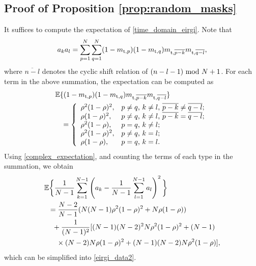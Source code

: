 \documentclass[journal,a4paper,10pt, romanappendices]{IEEEtran}
\begin{document}
\subsection{Proof of Proposition \ref{prop:random_masks}}\label{sec:proof_random_masks}
\begin{IEEEproof}
It suffices to compute the expectation of \eqref{time_domain_eirgi}. Note that
$$
a_k a_l = \sum_{p=1}^N \sum_{q=1}^N (1-m_{{\rm t},p})(1-m_{{\rm t},q})m_{{\rm t},\overline{p-k}}m_{{\rm t},\overline{q-l}},
$$
where $\overline{n-l}$ denotes the cyclic shift relation of $(n-l-1)~{\rm mod}~N+1$. For each term in the above summation, the expectation can be computed as
\begin{equation}\label{complex_expectation}
\begin{aligned}
&\mathbb{E}\{(1-m_{{\rm t},p})(1-m_{{\rm t},q})m_{{\rm t},\overline{p-k}}m_{{\rm t},\overline{q-l}}\}\\
&\hspace{3mm}=\left\{
  \begin{array}{ll}
    \rho^2(1-\rho)^2, & \hbox{$p\neq q$, $k\neq l$, $\overline{p-k}\neq \overline{q-l}$;} \\
    \rho(1-\rho)^2, & \hbox{$p\neq q$, $k\neq l$, $\overline{p-k}= \overline{q-l}$;} \\
    \rho^2(1-\rho), & \hbox{$p=q$, $k\neq l$;} \\
    \rho^2(1-\rho)^2, & \hbox{$p\neq q$, $k=l$;} \\
    \rho(1-\rho), & \hbox{$p=q$, $k=l$.} \\
  \end{array}
\right.
\end{aligned}
\end{equation}
Using \eqref{complex_expectation}, and counting the terms of each type in the summation, we obtain
$$
\begin{aligned}
&\mathbb{E}\bigg\{\frac{1}{N-1}\sum_{k=1}^{N-1} \left(a_k-\frac{1}{N-1}\sum_{l=1}^{N-1}a_l\right)^2\bigg\}\\
&\hspace{2mm}=\frac{N-2}{N-1}(N(N-1)\rho^2(1-\rho)^2+N\rho(1-\rho)) \\
&\hspace{4mm}+\frac{1}{(N-1)^2}[ (N-1)(N-2)^2N\rho^2(1-\rho)^2 + (N-1)\\
&\hspace{6mm} \times (N-2)N\rho(1-\rho)^2 + (N-1)(N-2)N\rho^2(1-\rho)],
\end{aligned}
$$
which can be simplified into \eqref{eirgi_data2}.
\end{IEEEproof}
\end{document}
